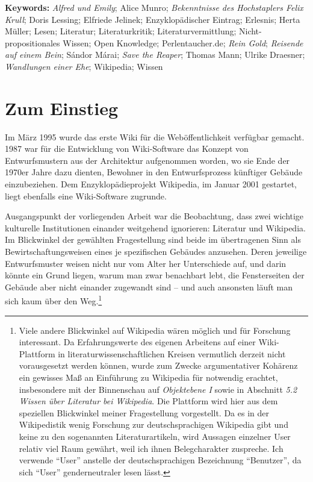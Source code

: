 \documentclass[fontsize=12pt]{scrartcl}
\begin{document}
\textbf{Keywords:} \textit{Alfred und Emily}; Alice Munro; \textit{Bekenntnisse des Hochstaplers Felix Krull}; Doris Lessing; Elfriede Jelinek; Enzyklop\"adischer Eintrag; Erlesnis; Herta M\"uller; Lesen; Literatur; Li\-te\-ra\-tur\-kritik; Li\-te\-ra\-tur\-ver\-mitt\-lung; Nicht-pro\-po\-si\-ti\-o\-na\-les Wissen; Open Knowledge; Per\-len\-tau\-cher.de; \textit{Rein Gold}; \textit{Reisende auf einem Bein}; S\'{a}ndor M\'{a}rai; \textit{Save the Reaper}; Thomas Mann; Ulrike Draesner; \textit{Wandlungen einer Ehe}; Wi\-ki\-pe\-dia; Wissen

\newpage
{}

\tableofcontents

\onehalfspacing

\newpage
\clearpage
{}

\section{Zum Einstieg}
\label{sec:1}

Im M\"arz 1995 wurde das erste Wiki f\"ur die Web\"of\-fent\-lichkeit verf\"ugbar gemacht. 1987 war f\"ur die Entwicklung von Wiki-Software das Konzept von Entwurfsmustern aus der Architektur aufgenommen worden, wo sie Ende der 1970er Jahre dazu dien\-ten, Bewohner\textsuperscript{\tiny *} in den Entwurfsprozess k\"unftiger Geb\"aude einzubeziehen. Dem Enzy\-klop\"adieprojekt Wi\-ki\-pe\-dia, im Januar 2001 gestartet, liegt ebenfalls eine Wiki-Software zugrunde.

Ausgangspunkt der vorliegenden Arbeit war die Beobachtung, dass zwei wichtige kulturelle Institutionen einander weitgehend ignorieren: Li\-te\-ra\-tur\- und Wi\-ki\-pe\-dia. Im Blickwinkel der gew\"ahlten Fragestellung sind beide im \"ubertragenen Sinn als Bewirtschaftungsweisen eines je spezifischen Geb\"audes anzusehen. Deren jeweilige Entwurfsmuster weisen nicht nur vom Alter her Unterschiede auf, und darin k\"onnte ein Grund liegen, warum man zwar benachbart lebt, die Fensterseiten der Geb\"aude aber nicht einander zugewandt sind -- und auch ansonsten l\"auft man sich kaum \"uber den Weg.\footnote{Viele andere Blickwinkel auf Wi\-ki\-pe\-dia w\"aren m\"oglich und f\"ur For\-schung interessant. Da Erfah\-rungswerte des eigenen Arbeitens auf einer Wiki-Plattform in li\-te\-ra\-tur\-wissenschaftlichen Kreisen vermutlich derzeit nicht vorausgesetzt werden k\"onnen, wurde zum Zwecke argumentativer Koh\"arenz ein gewisses Ma{\ss} an Einf\"uh\-rung zu Wi\-ki\-pe\-dia f\"ur notwendig erachtet, insbesondere mit der Binnenschau auf \textit{Objektebene I} sowie in Abschnitt \textit{5.2 Wissen \"uber Li\-te\-ra\-tur bei Wi\-ki\-pe\-dia}. Die Plattform wird \mbox{hier} aus dem speziellen Blickwinkel meiner Fragestellung vorgestellt. Da es in der Wikipedistik wenig For\-schung zur deutschspra\-chi\-gen Wi\-ki\-pe\-dia gibt und keine zu den sogenannten Li\-te\-ra\-tur\-artikeln, wird Aussagen einzelner \mbox{User} relativ viel Raum gew\"ahrt, weil ich ihnen Belegcharakter zuspreche. Ich verwende "`\mbox{User}"' anstelle der deutschspra\-chi\-gen Be\-zeichnung "`Be\-nut\-zer"', da sich "`\mbox{User}"' genderneutraler lesen l\"asst.}
\end{document}

